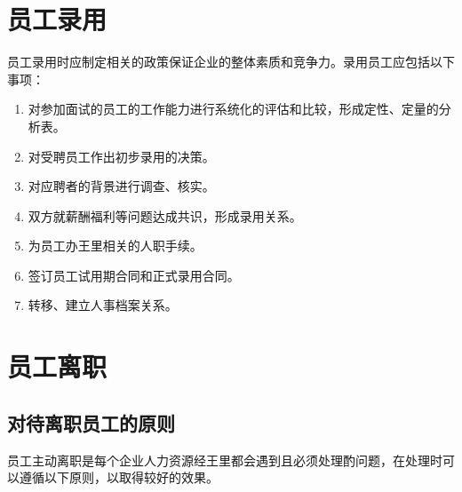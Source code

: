\section {员工录用}

    员工录用时应制定相关的政策保证企业的整体素质和竞争力。录用员工应包括以下事项：

    \begin{enumerate}
        \item 对参加面试的员工的工作能力进行系统化的评估和比较，形成定性、定量的分析表。

        \item 对受聘员工作出初步录用的决策。

        \item 对应聘者的背景进行调查、核实。

        \item 双方就薪酬福利等问题达成共识，形成录用关系。

        \item 为员工办王里相关的人职手续。

        \item 签订员工试用期合同和正式录用合同。

        \item 转移、建立人事档案关系。
    \end{enumerate}

\section {员工离职}

\subsection {对待离职员工的原则}

    员工主动离职是每个企业人力资源经王里都会遇到且必须处理酌问题，在处理时可以遵循以下原则，以取得较好的效果。

